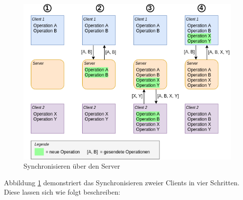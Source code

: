 \documentclass[a4paper, 12pt]{scrreprt}
\begin{document}
\begin{figure}[H]
	\centering
	\includegraphics[width=1\textwidth]{syncDiagram2.png}
	\caption{Synchronisieren über den Server}
	\label{fig:syncDiagram}
\end{figure}

Abbildung \ref{fig:syncDiagram} demonstriert das Synchronisieren zweier Clients in vier Schritten. Diese lassen sich wie folgt beschreiben:
\end{document}

